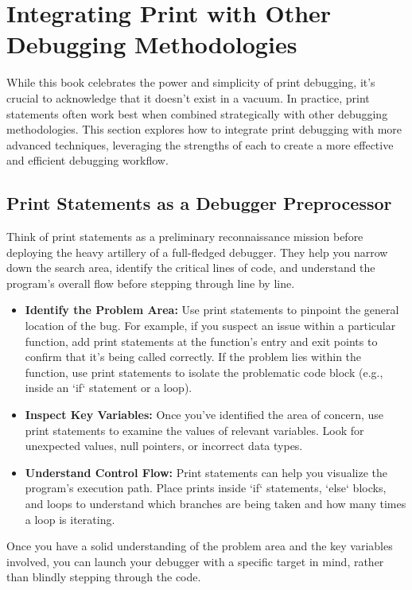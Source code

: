 \documentclass{article}
\begin{document}
{{{{\section*{Integrating Print with Other Debugging Methodologies}

While this book celebrates the power and simplicity of print debugging, it's crucial to acknowledge that it doesn't exist in a vacuum. In practice, print statements often work best when combined strategically with other debugging methodologies. This section explores how to integrate print debugging with more advanced techniques, leveraging the strengths of each to create a more effective and efficient debugging workflow.

\subsection*{Print Statements as a Debugger Preprocessor}

Think of print statements as a preliminary reconnaissance mission before deploying the heavy artillery of a full-fledged debugger. They help you narrow down the search area, identify the critical lines of code, and understand the program's overall flow before stepping through line by line.

\begin{itemize}
    \item \textbf{Identify the Problem Area:} Use print statements to pinpoint the general location of the bug. For example, if you suspect an issue within a particular function, add print statements at the function's entry and exit points to confirm that it's being called correctly. If the problem lies within the function, use print statements to isolate the problematic code block (e.g., inside an `if` statement or a loop).
    \item \textbf{Inspect Key Variables:} Once you've identified the area of concern, use print statements to examine the values of relevant variables. Look for unexpected values, null pointers, or incorrect data types.
    \item \textbf{Understand Control Flow:} Print statements can help you visualize the program's execution path. Place prints inside `if` statements, `else` blocks, and loops to understand which branches are being taken and how many times a loop is iterating.
\end{itemize}

Once you have a solid understanding of the problem area and the key variables involved, you can launch your debugger with a specific target in mind, rather than blindly stepping through the code.

}}}}
\end{document}
